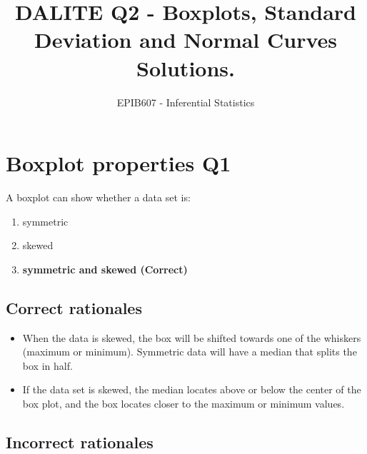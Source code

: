\documentclass[letterpaper,9pt,twoside,printwatermark=false]{pinp}
\title{DALITE Q2 - Boxplots, Standard Deviation and Normal Curves Solutions.}
\author[a]{EPIB607 - Inferential Statistics}
\affil[a]{Fall 2018, McGill University}
\providecommand{\tightlist}{%
  \setlength{\itemsep}{0pt}\setlength{\parskip}{0pt}}
\begin{document}
\verticaladjustment{-2pt}

\maketitle
\thispagestyle{firststyle}



\section{Boxplot properties Q1}\label{boxplot-properties-q1}

A boxplot can show whether a data set is:

\begin{enumerate}
\def\labelenumi{\alph{enumi})}
\tightlist
\item
  symmetric
\item
  skewed
\item
  \textbf{symmetric and skewed (Correct)}
\end{enumerate}

\subsection{Correct rationales}\label{correct-rationales}

\begin{itemize}
\tightlist
\item
  When the data is skewed, the box will be shifted towards one of the
  whiskers (maximum or minimum). Symmetric data will have a median that
  splits the box in half.
\item
  If the data set is skewed, the median locates above or below the
  center of the box plot, and the box locates closer to the maximum or
  minimum values.
\end{itemize}

\subsection{Incorrect rationales}\label{incorrect-rationales}
\end{document}
